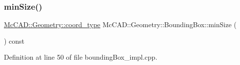 \mbox{\label{classMcCAD_1_1Geometry_1_1BoundingBox_af44f612439bea152e7d2a866a8f992ff}} 
\subsubsection{\texorpdfstring{min\+Size()}{minSize()}\hspace{0.1cm}{\footnotesize\ttfamily [2/2]}}
{\footnotesize\ttfamily \hyperlink{namespaceMcCAD_1_1Geometry_ac043b37a4a7e849fca22869e1982d2f8}{Mc\+C\+A\+D\+::\+Geometry\+::coord\+\_\+type} Mc\+C\+A\+D\+::\+Geometry\+::\+Bounding\+Box\+::min\+Size (\begin{DoxyParamCaption}{ }\end{DoxyParamCaption}) const}



Definition at line 50 of file bounding\+Box\+\_\+impl.\+cpp.


